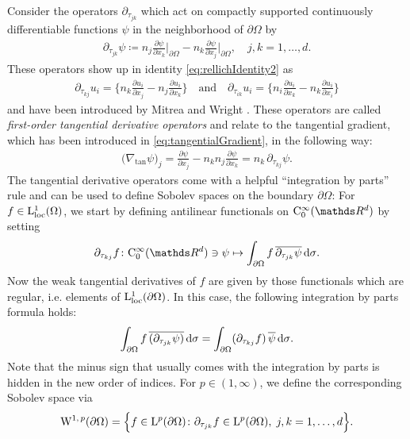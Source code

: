 Consider the operators $\partial_{\tau_{jk}}$ which act on compactly supported continuously differentiable functions $\psi$ in the neighborhood of $\partial\Omega$ by
\begin{align}
  \label{eq:defnTangDerivative}
  \partial_{\tau_{jk}} \psi \coloneqq n_j \frac{\partial \psi}{\partial x_k} \bigg|_{\partial\Omega} - n_k \frac{\partial \psi}{\partial x_j} \bigg|_{\partial\Omega}, \quad j,k = 1,\dots,d.
\end{align}
These operators show up in identity \eqref{eq:rellichIdentity2} as
\begin{align*}
  \partial_{\tau_{kj}} u_i = \Big\{ n_k \frac{\partial u_i}{\partial x_j} - n_j \frac{\partial u_i}{\partial x_k} \Big\}
  \quad\text{and}\quad
  \partial_{\tau_{ik}} u_i =  \Big\{ n_i \frac{\partial u_i}{\partial x_k} - n_k \frac{\partial u_i}{\partial x_i} \Big\}
\end{align*}
and have been introduced by Mitrea and Wright \cite[p.\@~16]{mitreaWright}. 
These operators are called \emph{first-order tangential derivative operators} and relate to the tangential gradient, which has been introduced in 
\eqref{eq:tangentialGradient}, in the following way:
\begin{align}
  \label{eq:relTanGrad}
  \big(\nabla_{\mathrm{tan}} \psi\big)_j = \frac{\partial \psi}{\partial x_j} - n_k n_j \frac{\partial \psi}{\partial x_k} = n_k \, \partial_{\tau_{kj}} \psi.
\end{align}
The tangential derivative operators come with a helpful  ``integration by parts'' rule and can be used to define Sobolev spaces on the boundary $\partial\Omega$:
For $f \in \mathrm{L}^1_{\mathrm{loc}}(\Omega)$, we start by defining antilinear functionals on $\CC_0^\infty(\R^d)$ by setting
\begin{align*}
    \partial_{\tau_{kj}} f \colon \CC_0^\infty(\R^d) \ni \psi \mapsto \int_{\partial\Omega} f \, \overline{ \partial_{\tau_{jk}} \psi} \d\sigma.
\end{align*}
Now the weak tangential derivatives of $f$ are given by those functionals which are regular, i.e. elements of $\mathrm{L}^1_{\mathrm{loc}}(\partial\Omega)$.
In this case, the following integration by parts formula holds:
\begin{align}
    \label{eq:intByPartsTang}
    \int_{\partial\Omega} f\, \overline{( \partial_{\tau_{jk}} \psi)} \, {\operatorname{d}\!{\sigma}} = \int_{\partial\Omega} (\partial_{\tau_{kj}} f)\, \overline{\psi} \, {\operatorname{d}\!{\sigma}}.
\end{align}
Note that the minus sign that usually comes with the integration by parts is hidden in the new order of indices.
For $p \in (1,\infty)$, we define the corresponding Sobolev space via
\begin{align*}
  \mathrm{W}^{1,\,p}(\partial\Omega) = \Big\{ f \in \mathrm{L}^p(\partial\Omega) \colon \partial_{\tau_{jk}} f \in \mathrm{L}^p(\partial\Omega), \; j,k = 1,\dots,d \Big\}.
\end{align*}

